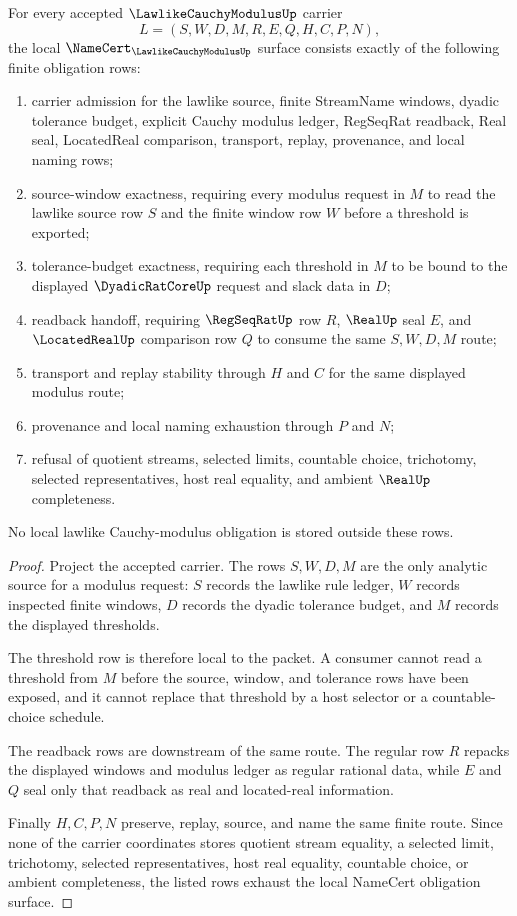\begin{theorem}
\label{thm:lawlike-cauchy-modulus-namecert-obligations}
For every accepted $\LawlikeCauchyModulusUp$ carrier
$$
L=(S,W,D,M,R,E,Q,H,C,P,N),
$$
the local $\NameCert_{\LawlikeCauchyModulusUp}$ surface consists exactly of the following finite obligation rows:
\begin{enumerate}
\item carrier admission for the lawlike source, finite StreamName windows, dyadic tolerance budget, explicit Cauchy modulus ledger, RegSeqRat readback, Real seal, LocatedReal comparison, transport, replay, provenance, and local naming rows;
\item source-window exactness, requiring every modulus request in $M$ to read the lawlike source row $S$ and the finite window row $W$ before a threshold is exported;
\item tolerance-budget exactness, requiring each threshold in $M$ to be bound to the displayed $\DyadicRatCoreUp$ request and slack data in $D$;
\item readback handoff, requiring $\RegSeqRatUp$ row $R$, $\RealUp$ seal $E$, and $\LocatedRealUp$ comparison row $Q$ to consume the same $S,W,D,M$ route;
\item transport and replay stability through $H$ and $C$ for the same displayed modulus route;
\item provenance and local naming exhaustion through $P$ and $N$;
\item refusal of quotient streams, selected limits, countable choice, trichotomy, selected representatives, host real equality, and ambient $\RealUp$ completeness.
\end{enumerate}
No local lawlike Cauchy-modulus obligation is stored outside these rows.
\end{theorem}
\begin{proof}
Project the accepted carrier. The rows $S,W,D,M$ are the only analytic source for a modulus request: $S$ records the lawlike rule ledger, $W$ records inspected finite windows, $D$ records the dyadic tolerance budget, and $M$ records the displayed thresholds.

The threshold row is therefore local to the packet. A consumer cannot read a threshold from $M$ before the source, window, and tolerance rows have been exposed, and it cannot replace that threshold by a host selector or a countable-choice schedule.

The readback rows are downstream of the same route. The regular row $R$ repacks the displayed windows and modulus ledger as regular rational data, while $E$ and $Q$ seal only that readback as real and located-real information.

Finally $H,C,P,N$ preserve, replay, source, and name the same finite route. Since none of the carrier coordinates stores quotient stream equality, a selected limit, trichotomy, selected representatives, host real equality, countable choice, or ambient completeness, the listed rows exhaust the local NameCert obligation surface.
\end{proof}

